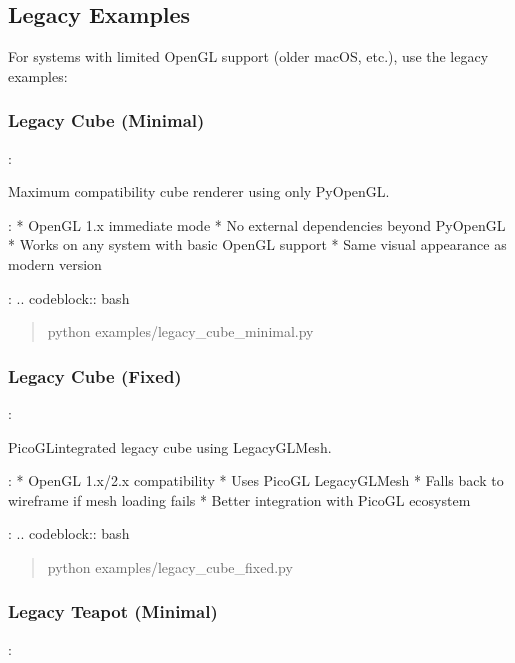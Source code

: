 \documentclass[a4paper,10pt,english,openany,oneside]{sphinxmanual}
\begin{document}
\subsection{Legacy Examples}
\label{\detokenize{examples:legacy-examples}}
\sphinxAtStartPar
For systems with limited OpenGL support (older macOS, etc.), use the legacy examples:


\subsubsection{Legacy Cube (Minimal)}
\label{\detokenize{examples:legacy-cube-minimal}}
\sphinxAtStartPar
{}: 

\sphinxAtStartPar
Maximum compatibility cube renderer using only PyOpenGL.

\sphinxAtStartPar
{}:
* OpenGL 1.x immediate mode
* No external dependencies beyond PyOpenGL
* Works on any system with basic OpenGL support
* Same visual appearance as modern version

\sphinxAtStartPar
{}:
.. code\sphinxhyphen{}block:: bash
\begin{quote}

\sphinxAtStartPar
python examples/legacy\_cube\_minimal.py
\end{quote}


\subsubsection{Legacy Cube (Fixed)}
\label{\detokenize{examples:legacy-cube-fixed}}
\sphinxAtStartPar
{}: 

\sphinxAtStartPar
PicoGL\sphinxhyphen{}integrated legacy cube using LegacyGLMesh.

\sphinxAtStartPar
{}:
* OpenGL 1.x/2.x compatibility
* Uses PicoGL LegacyGLMesh
* Falls back to wireframe if mesh loading fails
* Better integration with PicoGL ecosystem

\sphinxAtStartPar
{}:
.. code\sphinxhyphen{}block:: bash
\begin{quote}

\sphinxAtStartPar
python examples/legacy\_cube\_fixed.py
\end{quote}


\subsubsection{Legacy Teapot (Minimal)}
\label{\detokenize{examples:legacy-teapot-minimal}}
\sphinxAtStartPar
{}: 
\end{document}
